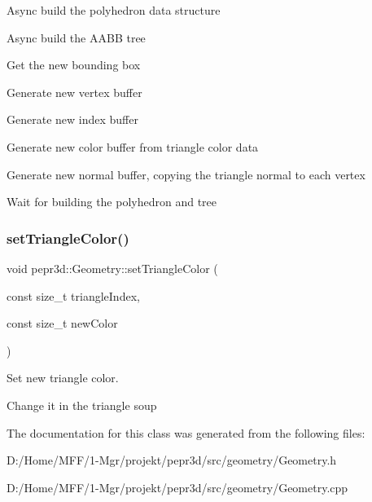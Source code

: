Async build the polyhedron data structure

Async build the A\+A\+BB tree

Get the new bounding box

Generate new vertex buffer

Generate new index buffer

Generate new color buffer from triangle color data

Generate new normal buffer, copying the triangle normal to each vertex

Wait for building the polyhedron and tree \mbox{\label{classpepr3d_1_1_geometry_aa473f80280346656024fc494994c065e}} 
\subsubsection{\texorpdfstring{setTriangleColor()}{setTriangleColor()}}
{\footnotesize\ttfamily void pepr3d\+::\+Geometry\+::set\+Triangle\+Color (\begin{DoxyParamCaption}\item[{const size\+\_\+t}]{triangle\+Index,  }\item[{const size\+\_\+t}]{new\+Color }\end{DoxyParamCaption})}



Set new triangle color. 

Change it in the triangle soup 

The documentation for this class was generated from the following files\+:\begin{DoxyCompactItemize}
\item 
D\+:/\+Home/\+M\+F\+F/1-\/\+Mgr/projekt/pepr3d/src/geometry/Geometry.\+h\item 
D\+:/\+Home/\+M\+F\+F/1-\/\+Mgr/projekt/pepr3d/src/geometry/Geometry.\+cpp\end{DoxyCompactItemize}
